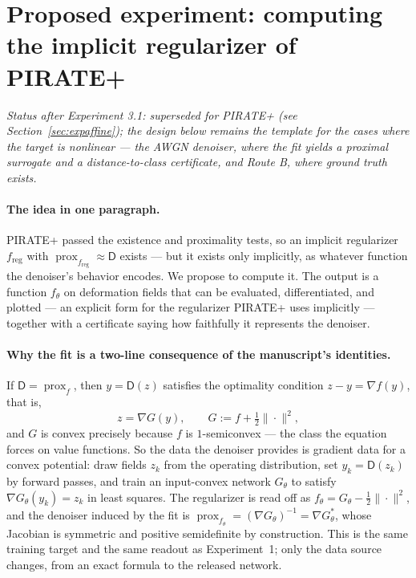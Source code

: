 \documentclass[11pt]{article}
\newcommand{\D}{\mathsf{D}}
\newcommand{\prox}{\operatorname{prox}}
\newcommand{\freg}{f_{\mathrm{reg}}}
\begin{document}
\section{Proposed experiment: computing the implicit regularizer of PIRATE+}
\label{sec:proposal}

\emph{Status after Experiment 3.1: superseded for PIRATE+ (see Section~\ref{sec:expaffine}); the design below remains the template for the cases where the target is nonlinear --- the AWGN denoiser, where the fit yields a proximal surrogate and a distance-to-class certificate, and Route B, where ground truth exists.}

\paragraph{The idea in one paragraph.} PIRATE+ passed the existence and proximality tests, so an implicit regularizer $\freg$ with $\prox_{\freg} \approx \D$ exists --- but it exists only implicitly, as whatever function the denoiser's behavior encodes. We propose to compute it. The output is a function $f_\theta$ on deformation fields that can be evaluated, differentiated, and plotted --- an explicit form for the regularizer PIRATE+ uses implicitly --- together with a certificate saying how faithfully it represents the denoiser.

\paragraph{Why the fit is a two-line consequence of the manuscript's identities.} If $\D = \prox_f$, then $y = \D(z)$ satisfies the optimality condition $z - y = \nabla f(y)$, that is,
\[
z = \nabla G(y), \qquad G := f + \tfrac12\|\cdot\|^2,
\]
and $G$ is convex precisely because $f$ is $1$-semiconvex --- the class the equation forces on value functions. So the data the denoiser provides is gradient data for a convex potential: draw fields $z_k$ from the operating distribution, set $y_k = \D(z_k)$ by forward passes, and train an input-convex network $G_\theta$ to satisfy $\nabla G_\theta(y_k) = z_k$ in least squares. The regularizer is read off as $f_\theta = G_\theta - \tfrac12\|\cdot\|^2$, and the denoiser induced by the fit is $\prox_{f_\theta} = (\nabla G_\theta)^{-1} = \nabla G_\theta^*$, whose Jacobian is symmetric and positive semidefinite by construction. This is the same training target and the same readout as Experiment~1; only the data source changes, from an exact formula to the released network.
\end{document}
